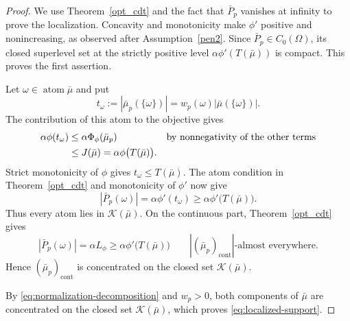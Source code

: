 \documentclass[11pt]{amsart}
\theoremstyle{definition}
\theoremstyle{remark}
\DeclareMathOperator{\atom}{atom}
\DeclareMathOperator{\cont}{cont}
\begin{document}
\begin{proof}
We use Theorem~\ref{opt_cdt} and the fact that $\bar P_p$
vanishes at infinity to prove the localization.  Concavity and
monotonicity make $\phi'$ positive and nonincreasing, as observed after
Assumption~\ref{pen2}. Since $\bar P_p\in C_0(\Omega)$, its closed
superlevel set at the strictly positive level
$\alpha\phi'(T(\bar\mu))$ is compact.  This proves the first assertion.

Let $\omega\in\atom\bar\mu$ and put
\begin{equation*}
	t_\omega
	:=|\bar\mu_p(\{\omega\})|
	=w_p(\omega)|\bar\mu(\{\omega\})|.
\end{equation*}
The contribution of this atom to the objective gives
\begin{align*}
	\alpha\phi(t_\omega)
	&\leq \alpha\Phi_\phi(\bar\mu_p)
	&&\text{by nonnegativity of the other terms}\notag\\
	&\leq J(\bar\mu)
	=\alpha\phi\bigl(T(\bar\mu)\bigr).
\end{align*}
Strict monotonicity of $\phi$ gives $t_\omega\leq T(\bar\mu)$.  The atom condition in
Theorem~\ref{opt_cdt} and monotonicity of $\phi'$ now give
\begin{equation*}
	|\bar P_p(\omega)|
	=\alpha\phi'(t_\omega)
	\geq\alpha\phi'\bigl(T(\bar\mu)\bigr).
\end{equation*}
Thus every atom lies in $\mathcal K(\bar\mu)$. On the continuous part, Theorem~\ref{opt_cdt} gives
\begin{equation*}
	|\bar P_p(\omega)|=\alpha L_\phi
	\geq\alpha\phi'\bigl(T(\bar\mu)\bigr)
	\qquad |(\bar\mu_p)_{\cont}|\text{-almost everywhere}.
\end{equation*}
Hence $(\bar\mu_p)_{\cont}$ is concentrated on the closed set
$\mathcal K(\bar\mu)$.  

By \eqref{eq:normalization-decomposition} and $w_p>0$, both
components of $\bar\mu$ are concentrated on the closed set
$\mathcal K(\bar\mu)$, which proves \eqref{eq:localized-support}.
\end{proof}
\end{document}
